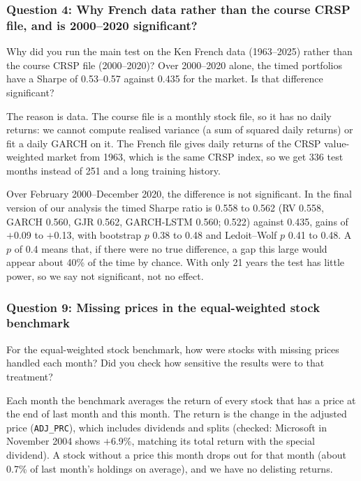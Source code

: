 \subsubsection*{Question 4: Why French data rather than the course CRSP file, and is 2000--2020 significant?}
\begin{question}
Why did you run the main test on the Ken French data (1963--2025) rather than the course CRSP file (2000--2020)? Over 2000--2020 alone, the timed portfolios have a Sharpe of 0.53--0.57 against 0.435 for the market. Is that difference significant?
\end{question}
The reason is data. The course file is a monthly stock file, so it has no daily returns: we cannot compute realised variance (a sum of squared daily returns) or fit a daily GARCH on it. The French file gives daily returns of the CRSP value-weighted market from 1963, which is the same CRSP index, so we get 336 test months instead of 251 and a long training history.

Over February 2000--December 2020, the difference is not significant. In the final version of our analysis the timed Sharpe ratio is 0.558 to 0.562 (RV 0.558, GARCH 0.560, GJR 0.562, GARCH-LSTM 0.560; \VIX{} 0.522) against 0.435, gains of $+$0.09 to $+$0.13, with bootstrap $p$ 0.38 to 0.48 and Ledoit--Wolf $p$ 0.41 to 0.48. A $p$ of 0.4 means that, if there were no true difference, a gap this large would appear about 40\% of the time by chance. With only 21 years the test has little power, so we say not significant, not no effect.

\subsubsection*{Question 9: Missing prices in the equal-weighted stock benchmark}
\begin{question}
For the equal-weighted stock benchmark, how were stocks with missing prices handled each month? Did you check how sensitive the results were to that treatment?
\end{question}
Each month the benchmark averages the return of every stock that has a price at the end of last month and this month. The return is the change in the adjusted price (\texttt{ADJ\_PRC}), which includes dividends and splits (checked: Microsoft in November 2004 shows $+$6.9\%, matching its total return with the special dividend). A stock without a price this month drops out for that month (about 0.7\% of last month's holdings on average), and we have no delisting returns.


